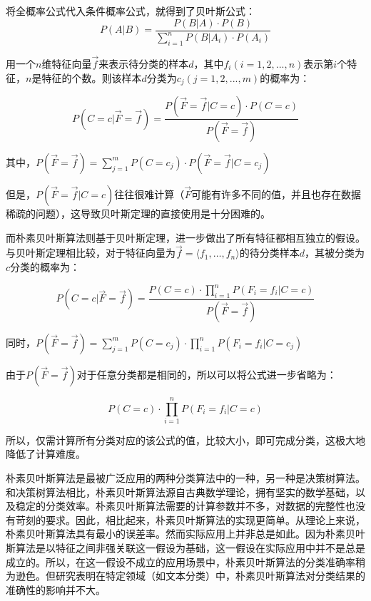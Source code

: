 \documentclass[UTF8,zihao=-4]{ctexart}
\begin{document}
	
	将全概率公式代入条件概率公式，就得到了贝叶斯公式：
	\begin{equation}
	\label{equ:bayes}
	P(A|B) = \frac{P(B|A) \cdot P(B)}{\sum\limits_{i=1}^{n}P(B|A_i) \cdot P(A_i)}
	\end{equation}
	
	用一个$n$维特征向量$\vec{f}$来表示待分类的样本$d$，其中$f_i(i=1,2,...,n)$表示第$i$个特征，$n$是特征的个数。则该样本$d$分类为$c_j(j=1,2,...,m)$的概率为：
	
	\begin{equation}
	\label{equ:nb}
	P(C=c|\vec{F}=\vec{f})=\frac{P(\vec{F}=\vec{f}|C=c)\cdot P(C=c) } {P(\vec{F}=\vec{f})}
	\end{equation}
	
	其中，$P(\vec{F}=\vec{f})=\sum\limits_{j=1}^{m} P(C=c_j) \cdot P(\vec{F}=\vec{f}|C=c_j)$
	
	但是，$P(\vec{F}=\vec{f}|C=c)$往往很难计算（$\vec{F}$可能有许多不同的值，并且也存在数据稀疏的问题），这导致贝叶斯定理的直接使用是十分困难的。
	
	而朴素贝叶斯算法则基于贝叶斯定理，进一步做出了所有特征都相互独立的假设。与贝叶斯定理相比较，对于特征向量为$\vec{f}=\langle f_1, \ldots, f_n \rangle$的待分类样本$d$，其被分类为$c$分类的概率为：
	
	\begin{equation}
	P(C=c|\vec{F}=\vec{f})=\frac{P(C=c) \cdot \prod\limits_{i=1}^{n} P(F_i=f_i|C=c)} {P(\vec{F}=\vec{f})}
	\end{equation}
		
	同时，$P(\vec{F}=\vec{f})=\sum\limits_{j=1}^{m} P(C=c_j) \cdot \prod\limits_{i=1}^{n}  P(F_i=f_i|C=c_j)$
	
	由于$P(\vec{F}=\vec{f})$对于任意分类都是相同的，所以可以将公式进一步省略为：
	
	\begin{equation}
	P(C=c) \cdot \prod\limits_{i=1}^{n} P(F_i=f_i|C=c)
	\end{equation}
	
	所以，仅需计算所有分类对应的该公式的值，比较大小，即可完成分类，这极大地降低了计算难度。
	
	朴素贝叶斯算法是最被广泛应用的两种分类算法中的一种，另一种是决策树算法。和决策树算法相比，朴素贝叶斯算法源自古典数学理论，拥有坚实的数学基础，以及稳定的分类效率\cite{nb}。朴素贝叶斯算法需要的计算参数并不多，对数据的完整性也没有苛刻的要求。因此，相比起来，朴素贝叶斯算法的实现更简单。从理论上来说，朴素贝叶斯算法具有最小的误差率。然而实际应用上并非总是如此。因为朴素贝叶斯算法是以特征之间非强关联这一假设为基础，这一假设在实际应用中并不是总是成立的。所以，在这一假设不成立的应用场景中，朴素贝叶斯算法的分类准确率稍为逊色。但研究表明在特定领域（如文本分类）中，朴素贝叶斯算法对分类结果的准确性的影响并不大。
\end{document}
